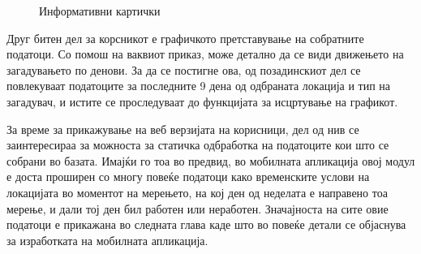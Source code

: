 \documentclass{uvamscse}
\begin{document}
\begin{figure}[H]
\centering
  \caption{Информативни картички}
  \label{fig:cards}
\end{figure}
\vspace{5mm}


Друг битен дел за корсникот е графичкото претставување на собратните податоци. Со помош на ваквиот приказ, може детално да се види движењето на загадувањето по денови. За да се постигне ова, од позадинскиот дел се повлекуваат податоците за последните 9 дена од одбраната локација и тип на загадувач, и истите се проследуваат до функцијата за исцртување на графикот. 
\vspace{5mm}

За време за прикажување на веб верзијата на корисници, дел од нив се заинтересираа за можноста за статичка одбработка на податоците кои што се собрани во базата. Имајќи го тоа во предвид, во мобилната апликација овој модул е доста проширен со многу повеќе податоци како временските услови на локацијата во моментот на мерењето, на кој ден од неделата е направено тоа мерење, и дали тој ден бил работен или неработен. Значајноста на сите овие податоци е прикажана во следната глава каде што во повеќе детали се објаснува за изработката на мобилната апликација.
\end{document}
